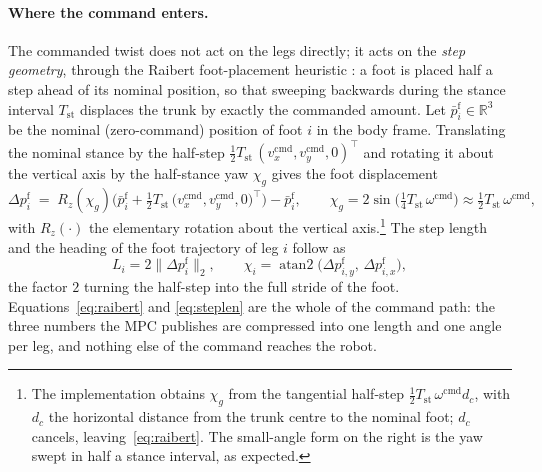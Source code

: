 \documentclass[11pt,a4paper]{article}
\newcommand{\R}{\mathbb{R}}
\newcommand{\Tst}{T_{\mathrm{st}}}
\newcommand{\pf}{p^{\mathrm{f}}}
\begin{document}
\paragraph{Where the command enters.} The commanded twist does not act on the legs directly; it acts on the
\emph{step geometry}, through the Raibert foot-placement heuristic \cite{raibert1986legged}: a foot is placed
half a step ahead of its nominal position, so that sweeping backwards during the stance interval $\Tst$
displaces the trunk by exactly the commanded amount. Let $\bar\pf_i\in\R^3$ be the nominal (zero-command)
position of foot $i$ in the body frame. Translating the nominal stance by the half-step
$\tfrac{1}{2}\Tst\,(v_x^{\mathrm{cmd}},v_y^{\mathrm{cmd}},0)^{\!\top}$ and rotating it about the vertical axis
by the half-stance yaw $\chi_g$ gives the foot displacement
\begin{equation}
  \Delta\pf_i \;=\; R_z(\chi_g)\Big(\bar\pf_i+\tfrac{1}{2}\Tst\,
                  \big(v_x^{\mathrm{cmd}},v_y^{\mathrm{cmd}},0\big)^{\!\top}\Big)-\bar\pf_i,
  \qquad
  \chi_g = 2\sin\!\Big(\tfrac{1}{4}\Tst\,\omega^{\mathrm{cmd}}\Big)\approx\tfrac{1}{2}\Tst\,\omega^{\mathrm{cmd}},
  \label{eq:raibert}
\end{equation}
with $R_z(\cdot)$ the elementary rotation about the vertical axis.\footnote{The implementation obtains
$\chi_g$ from the tangential half-step $\tfrac12\Tst\,\omega^{\mathrm{cmd}}d_c$, with $d_c$ the horizontal
distance from the trunk centre to the nominal foot; $d_c$ cancels, leaving~\eqref{eq:raibert}. The small-angle
form on the right is the yaw swept in half a stance interval, as expected.} The step length and the heading of
the foot trajectory of leg $i$ follow as
\begin{equation}
  L_i = 2\big\|\Delta\pf_i\big\|_2,
  \qquad
  \chi_i=\operatorname{atan2}\big(\Delta\pf_{i,y},\,\Delta\pf_{i,x}\big),
  \label{eq:steplen}
\end{equation}
the factor $2$ turning the half-step into the full stride of the foot. Equations~\eqref{eq:raibert} and
\eqref{eq:steplen} are the whole of the command path: the three numbers the MPC publishes are compressed into
one length and one angle per leg, and nothing else of the command reaches the robot.
\end{document}
